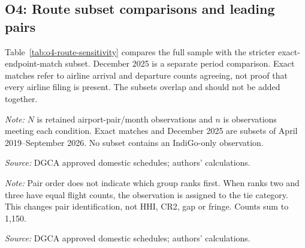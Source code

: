 \documentclass[12pt,a4paper]{article}
\begin{document}
\subsection{O4: Route subset comparisons and leading pairs}
\label{app:o4-route-checks}
Table~\ref{tab:o4-route-sensitivity} compares the full sample with the stricter exact-endpoint-match subset. December 2025 is a separate period comparison. Exact matches refer to airline arrival and departure counts agreeing, not proof that every airline filing is present. The subsets overlap and should not be added together.

\begin{minipage}{\linewidth}
\captionsetup{font=small,labelfont=bf,justification=raggedright,singlelinecheck=false,hypcap=false}
\label{tab:o4-route-sensitivity}
\centering
{\small{}\setlength{\tabcolsep}{4pt}\par}
\vspace{4pt}
{\footnotesize{}\raggedright\textit{Note:} $N$ is retained airport-pair/month observations and $n$ is observations meeting each condition. Exact matches and December 2025 are subsets of April 2019--September 2026. No subset contains an IndiGo-only observation.\par
\textit{Source:} DGCA approved domestic schedules; authors' calculations.\par}
\end{minipage}

\begin{minipage}{\linewidth}
\captionsetup{font=small,labelfont=bf,justification=raggedright,singlelinecheck=false,hypcap=false}
\label{tab:o4-route-leaders}
\centering
{\small{}\setlength{\tabcolsep}{4pt}\par}
\vspace{4pt}
{\footnotesize{}\raggedright\textit{Note:} Pair order does not indicate which group ranks first. When ranks two and three have equal flight counts, the observation is assigned to the tie category. This changes pair identification, not HHI, CR2, gap or fringe. Counts sum to 1,150.\par
\textit{Source:} DGCA approved domestic schedules; authors' calculations.\par}
\end{minipage}
\end{document}
